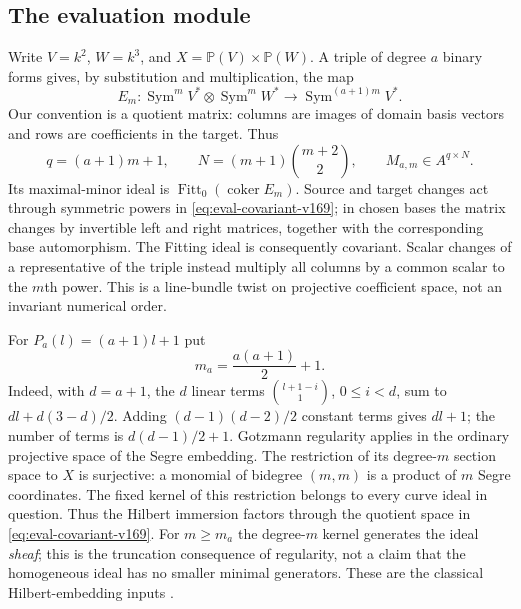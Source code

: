 \documentclass[11pt,reqno]{amsart}
\numberwithin{equation}{section}
\theoremstyle{definition}\newtheorem{definition}[theorem]{Definition}
\theoremstyle{remark}\newtheorem{remark}[theorem]{Remark}
\newcommand{\Pj}{\mathbb P}\newcommand{\A}{\mathbb A}
\begin{document}
\subsection{The evaluation module}
Write $V=k^2$, $W=k^3$, and $X=\Pj(V)\times\Pj(W)$. A triple of degree
$a$ binary forms gives, by substitution and multiplication, the map
\begin{equation}\label{eq:eval-covariant-v169}
 E_m:\operatorname{Sym}^m V^*\otimes\operatorname{Sym}^m W^*
       \longrightarrow\operatorname{Sym}^{(a+1)m}V^*.
\end{equation}
Our convention is a quotient matrix: columns are images of domain basis
vectors and rows are coefficients in the target. Thus
\[
 q=(a+1)m+1,\qquad N=(m+1)\binom{m+2}{2},\qquad M_{a,m}\in A^{q\times N}.
\]
Its maximal-minor ideal is $\operatorname{Fitt}_0(\operatorname{coker}E_m)$.
Source and target changes act through symmetric powers in
\eqref{eq:eval-covariant-v169}; in chosen bases the matrix changes by
invertible left and right matrices, together with the corresponding
base automorphism. The Fitting ideal is consequently covariant. Scalar
changes of a representative of the triple instead multiply all columns
by a common scalar to the $m$th power. This is a line-bundle twist on
projective coefficient space, not an invariant numerical order.

For $P_a(l)=(a+1)l+1$ put
\begin{equation}\label{eq:gotzmann-size-v169}
 m_a=\frac{a(a+1)}2+1.
\end{equation}
Indeed, with $d=a+1$, the $d$ linear terms
$\binom{l+1-i}{1}$, $0\leq i<d$, sum to
$dl+d(3-d)/2$. Adding $(d-1)(d-2)/2$ constant terms gives $dl+1$;
the number of terms is $d(d-1)/2+1$. Gotzmann regularity applies in
the ordinary projective space of the Segre embedding. The restriction
of its degree-$m$ section space to $X$ is surjective: a monomial of
bidegree $(m,m)$ is a product of $m$ Segre coordinates. The fixed
kernel of this restriction belongs to every curve ideal in question.
Thus the Hilbert immersion factors through the quotient space in
\eqref{eq:eval-covariant-v169}. For $m\geq m_a$ the degree-$m$ kernel
generates the ideal \emph{sheaf}; this is the truncation consequence of
regularity, not a claim that the homogeneous ideal has no smaller
minimal generators. These are the classical Hilbert-embedding inputs
\cite{Gotzmann167}.
\end{document}
